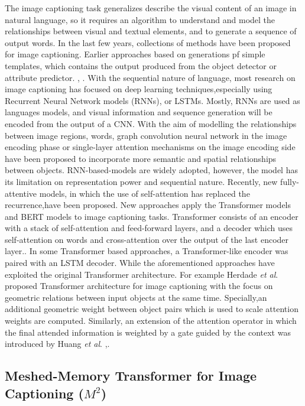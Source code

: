 \documentclass[
]{krantz}
\begin{document}
The image captioning task generalizes describe the visual content of an image in natural language, so it requires an algorithm to understand and model the relationships between visual and textual elements, and to generate a sequence of output words.\citep{cornia2020m2}
In the last few years, collections of methods have been proposed for image captioning. Earlier approaches based on generations pf simple templates, which contains the output produced from the object detector or attribute predictor. \citep{Socher10connectingmodalities}, \citep{5487377}.
With the sequential nature of language, most research on image captioning has focused on deep learning techniques,especially using Recurrent Neural Network models (RNNs)\citep{vinyals},\citep{karpthy1} or LSTMs. Mostly, RNNs are used as languages models, and visual information and sequence generation will be encoded from the output of a CNN. With the aim of modelling the relationships between image regions, words, graph convolution neural network in the image encoding phase \citep{yao1} or single-layer attention mechanisms \citep{xu1} on the image encoding side have been proposed to incorporate more semantic and spatial relationships between objects.
RNN-based-models are widely adopted, however, the model has its limitation on representation power and sequential nature.\citep{cornia2020m2}
Recently, new fully-attentive models, in which the use of self-attention has replaced the recurrence,have been proposed. New approaches apply the Transformer models \citep{NIPS2017_3f5ee243} and BERT \citep{devlin-etal-2019-bert} models to image captioning tasks.
Transformer consists of an encoder with a stack of self-attention and feed-forward layers, and a decoder which uses self-attention on words and cross-attention over the output of the last encoder layer.\citep{cornia2020m2}. In some Transformer based approaches, a Transformer-like encoder was paired with an LSTM decoder. While the aforementioned approaches have exploited the original Transformer architecture.
For example Herdade \emph{et al}. \citep{HerdadeKBS19} proposed Transformer architecture for image captioning with the focus on geometric relations between input objects at the same time. Specially,an additional geometric weight between object pairs which is used to scale attention weights are computed. Similarly, an extension of the attention operator in which the final attended information is weighted by a gate guided by the context was introduced by Huang \emph{et al}. \citep{huang1},\citep{cornia2020m2}.

\hypertarget{meshed-memory-transformer-for-image-captioning-m2}{%
\subsection{\texorpdfstring{Meshed-Memory Transformer for Image Captioning (\(M^2\))}{Meshed-Memory Transformer for Image Captioning (M\^{}2)}}\label{meshed-memory-transformer-for-image-captioning-m2}}
\end{document}
